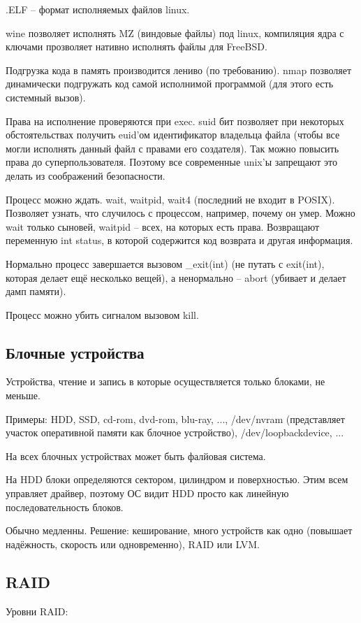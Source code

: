 \documentclass[a4paper,10pt]{article}
\begin{document}
.ELF -- формат исполняемых файлов linux.

wine позволяет исполнять MZ (виндовые файлы) под linux, компиляция ядра с ключами прозволяет нативно исполнять файлы для FreeBSD. 

Подгрузка кода в память производится лениво (по требованию). nmap позволяет динамически подгружать код самой исполнимой программой (для этого есть системный вызов). 

Права на исполнение проверяются при exec. suid бит позволяет при некоторых обстоятельствах получить euid'ом идентификатор владельца файла (чтобы все могли исполнять данный файл с правами его создателя). Так можно повысить права до суперпользователя. Поэтому все современные unix'ы запрещают это делать из соображений безопасности. 


Процесс можно ждать. wait, waitpid, wait4 (последний не входит в POSIX). Позволяет узнать, что случилось с процессом, например, почему он умер. Можно wait только сыновей, waitpid -- всех, на которых есть права. Возвращают переменную int status, в которой содержится код возврата и другая информация.

Нормально процесс завершается вызовом \_exit(int) (не путать с exit(int), которая делает ещё несколько вещей), а ненормально -- abort (убивает и делает дамп памяти).

Процесс можно убить сигналом вызовом kill.

\subsection{Блочные устройства}
Устройства, чтение и запись в которые осуществляется только блоками, не меньше.

Примеры: HDD, SSD, cd-rom, dvd-rom, blu-ray, ..., /dev/nvram (представляет участок оперативной памяти как блочное устройство), /dev/loopbackdevice, ...

На всех блочных устройствах может быть фалйовая система.

На HDD блоки определяются сектором, цилиндром и поверхностью. Этим всем управляет драйвер, поэтому ОС видит HDD просто как линейную последовательность блоков.

Обычно медленны. Решение: 
кеширование, 
много устройств как одно (повышает надёжность, скорость или одновременно),
RAID или LVM.
\subsection{RAID}
Уровни RAID:
\end{document}

